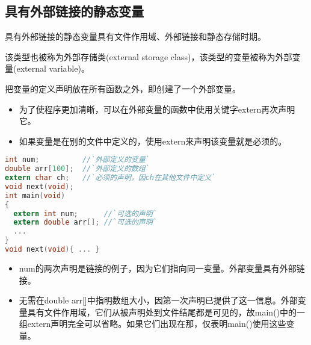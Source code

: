 \subsection{具有外部链接的静态变量}
\begin{frame}[fragile]\ft{\subsecname}
 具有外部链接的静态变量具有文件作用域、外部链接和静态存储时期。\vspace{0.1in}
 
 该类型也被称为外部存储类{\tf (external storage class)}，该类型的变量被称为外部变量{\tf (external variable)}。\vspace{0.1in}

 把变量的定义声明放在所有函数之外，即创建了一个外部变量。
\end{frame}

\begin{frame}[fragile]\ft{\subsecname}
  \begin{itemize}
  \item 
    为了使程序更加清晰，可以在外部变量的函数中使用关键字{\tf extern}再次声明它。\\[0.1in]
  \item
    如果变量是在别的文件中定义的，使用{\tf extern}来声明该变量就是必须的。
  \end{itemize}
\end{frame}

\begin{frame}[fragile]\ft{\subsecname}
\begin{lstlisting}[language=c,frame=single]
int num;          //`外部定义的变量`
double arr[100];  //`外部定义的数组`
extern char ch;   //`必须的声明，因ch在其他文件中定义`
void next(void);
int main(void)
{
  extern int num;      //`可选的声明`
  extern double arr[]; //`可选的声明`
  ...
}
void next(void){ ... }
\end{lstlisting}
\end{frame}

\begin{frame}[fragile]\ft{\subsecname}
\begin{itemize}
\item {\tf num}的两次声明是链接的例子，因为它们指向同一变量。外部变量具有外部链接。
\item 无需在{\tf double arr[]}中指明数组大小，因第一次声明已提供了这一信息。外部变量具有文件作用域，它们从被声明处到文件结尾都是可见的，故{\tf main()}中的一组{\tf extern}声明完全可以省略。如果它们出现在那，仅表明{\tf main()}使用这些变量。
\end{itemize}
\end{frame}

